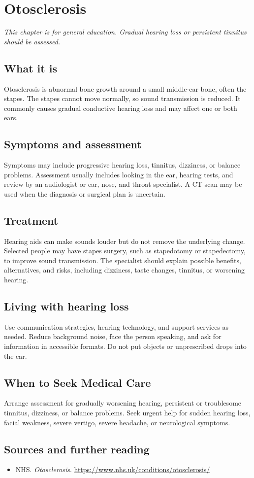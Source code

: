 \chapter{Otosclerosis}

\medskip
\noindent\textit{This chapter is for general education. Gradual hearing loss or persistent tinnitus should be assessed.}

\section*{What it is}
Otosclerosis is abnormal bone growth around a small middle-ear bone, often the stapes. The stapes cannot move normally, so sound transmission is reduced. It commonly causes gradual conductive hearing loss and may affect one or both ears.

\section*{Symptoms and assessment}
Symptoms may include progressive hearing loss, tinnitus, dizziness, or balance problems. Assessment usually includes looking in the ear, hearing tests, and review by an audiologist or ear, nose, and throat specialist. A CT scan may be used when the diagnosis or surgical plan is uncertain.

\section*{Treatment}
Hearing aids can make sounds louder but do not remove the underlying change. Selected people may have stapes surgery, such as stapedotomy or stapedectomy, to improve sound transmission. The specialist should explain possible benefits, alternatives, and risks, including dizziness, taste changes, tinnitus, or worsening hearing.

\section*{Living with hearing loss}
Use communication strategies, hearing technology, and support services as needed. Reduce background noise, face the person speaking, and ask for information in accessible formats. Do not put objects or unprescribed drops into the ear.

\section*{When to Seek Medical Care}
Arrange assessment for gradually worsening hearing, persistent or troublesome tinnitus, dizziness, or balance problems. Seek urgent help for sudden hearing loss, facial weakness, severe vertigo, severe headache, or neurological symptoms.

\section*{Sources and further reading}
\begin{itemize}
\item NHS. \textit{Otosclerosis}. \url{https://www.nhs.uk/conditions/otosclerosis/}
\end{itemize}
